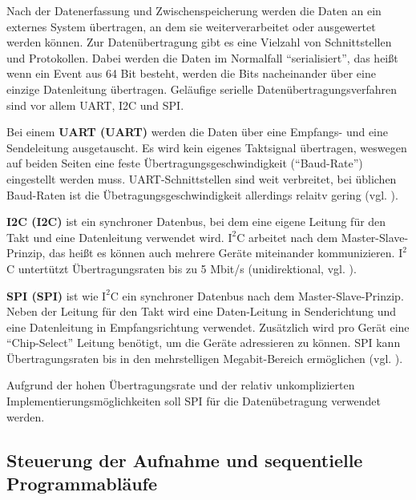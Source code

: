 Nach der Datenerfassung und Zwischenspeicherung werden die Daten an ein externes System übertragen, an dem sie weiterverarbeitet oder ausgewertet werden können. Zur Datenübertragung gibt es eine Vielzahl von Schnittstellen und Protokollen. Dabei werden die Daten im Normalfall ``serialisiert'', das heißt wenn ein Event aus 64 Bit besteht, werden die Bits nacheinander über eine einzige Datenleitung übertragen. Geläufige serielle Datenübertragungsverfahren sind vor allem \acrshort{UART}, \acrshort{I2C} und \acrshort{SPI}.
\begin{description}
	\item Bei einem \textbf{UART (\acrlong{UART})} werden die Daten über eine Empfangs- und eine Sendeleitung ausgetauscht. Es wird kein eigenes Taktsignal übertragen, weswegen auf beiden Seiten eine feste Übertragungsgeschwindigkeit (``Baud-Rate'') eingestellt werden muss. UART-Schnittstellen sind weit verbreitet, bei üblichen Baud-Raten ist die Übetragungsgeschwindigkeit allerdings relaitv gering (vgl. \cite{wiki:UART}).
	\item \textbf{\acrshort{I2C} (\acrlong{I2C})} ist ein synchroner Datenbus, bei dem eine eigene Leitung für den Takt und eine Datenleitung verwendet wird. $\text{I}^2$C arbeitet nach dem Master-Slave-Prinzip, das heißt es können auch mehrere Geräte miteinander kommunizieren. $\text{I}^2$C untertützt Übertragungsraten bis zu 5 Mbit/s (unidirektional, vgl. \cite{wiki:I2C}).
	\item \textbf{\acrshort{SPI} (\acrlong{SPI})} ist wie $\text{I}^2$C ein synchroner Datenbus nach dem Master-Slave-Prinzip. Neben der Leitung für den Takt wird eine Daten-Leitung in Senderichtung und eine Datenleitung in Empfangsrichtung verwendet. Zusätzlich wird pro Gerät eine ``Chip-Select'' Leitung benötigt, um die Geräte adressieren zu können. SPI kann Übertragungsraten bis in den mehrstelligen Megabit-Bereich ermöglichen (vgl. \cite{wiki:SPI}).
\end{description}

Aufgrund der hohen Übertragungsrate und der relativ unkomplizierten Implementierungsmöglichkeiten soll SPI für die Datenübetragung verwendet werden.


\subsection{Steuerung der Aufnahme und sequentielle Programmabläufe}

